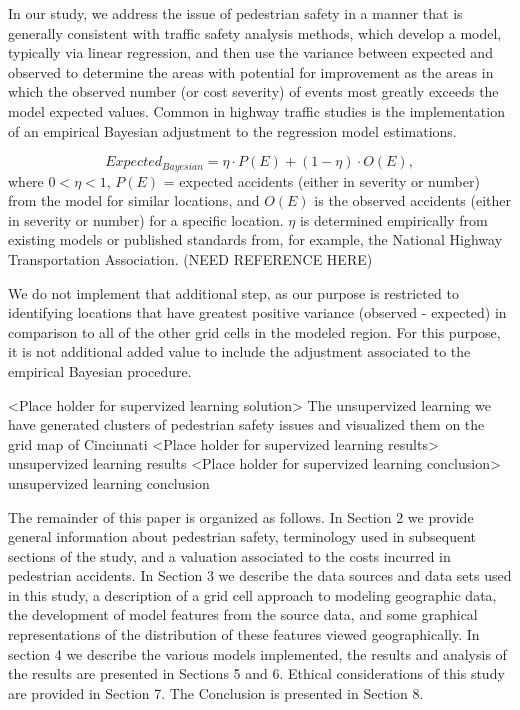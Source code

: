 \documentclass{llncs}
\begin{document}
In our study, we address the issue of pedestrian safety in a manner that is generally consistent with traffic safety analysis methods, which develop a model, typically via linear regression,  and then use the variance between expected and observed to determine the areas with potential for improvement as the areas in which the observed number (or cost severity) of events most greatly exceeds the model expected values. Common in highway traffic studies is the implementation of an empirical Bayesian adjustment to the regression model estimations.

\begin{equation} Expected_{Bayesian} = \eta \cdot P(E)  + (1 - \eta) \cdot O(E),
\end{equation} \newline
where $0 < \eta < 1$, $P(E)$ = expected accidents (either in severity or number) from the model for similar locations, and
$O(E)$ is the observed accidents (either in severity or number) for a specific location. $\eta$ is determined empirically from existing models or published standards from, for example, the National Highway Transportation Association. (NEED REFERENCE HERE)

We do not implement that additional step, as our purpose is restricted to identifying locations that have greatest positive variance (observed - expected) in comparison to all of the other grid cells in the modeled region. For this purpose, it is not additional added value to include the adjustment associated to the empirical Bayesian procedure.

<Place holder for supervized learning solution>
The unsupervized learning we have generated clusters of pedestrian safety issues and visualized them on the grid map of Cincinnati
<Place holder for supervized learning results>
unsupervized learning results
<Place holder for supervized learning conclusion>
unsupervized learning conclusion

The remainder of this paper is organized as follows. In Section 2 we provide general information about pedestrian safety, terminology used in subsequent sections of the study, and a valuation associated to the costs incurred in pedestrian accidents. In Section 3 we describe the data sources and data sets used in this study, a description of a grid cell approach to modeling geographic data, the development of model features from the source data, and some graphical representations of the distribution of these features viewed geographically. In section 4 we describe the various models implemented, the results and analysis of the results are presented in Sections 5 and 6. Ethical considerations of this study are provided in Section 7. The Conclusion is presented in Section 8. 
\end{document}
